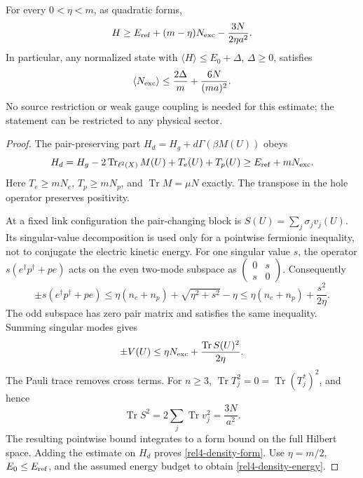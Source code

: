 \begin{proposition}
\label{rel4-density}
For every $0<\eta<m$, as quadratic forms,
\begin{equation}
 H\ge E_{\rm ref}+(m-\eta)N_{\rm exc}
                  -\frac{3N}{2\eta a^2}.
 \label{rel4-density-form}
\end{equation}
In particular, any normalized state with
$\langle H\rangle\le E_0+\Delta$, $\Delta\ge0$, satisfies
\begin{equation}
 \langle N_{\rm exc}\rangle
 \le \frac{2\Delta}{m}+\frac{6N}{(ma)^2}.
 \label{rel4-density-energy}
\end{equation}
No source restriction or weak gauge coupling is needed for this
estimate; the statement can be restricted to any physical sector.
\end{proposition}
\begin{proof}
The pair-preserving part $H_d=H_g+d\Gamma(\beta M(U))$ obeys
\[
 H_d=H_g-2\operatorname{Tr}_{\ell^2(X)}M(U)+T_e(U)+T_p(U)
 \ge E_{\rm ref}+mN_{\rm exc}.
\]
Here $T_e\ge mN_e$, $T_p\ge mN_p$, and
$\operatorname{Tr}M=\mu N$ exactly. The transpose in the hole
operator preserves positivity.

At a fixed link configuration the pair-changing block is
$S(U)=\sum_j\sigma_jv_j(U)$. Its singular-value decomposition is
used only for a pointwise fermionic inequality, not to conjugate the
electric kinetic energy. For one singular value $s$, the operator
$s(e^\dagger p^\dagger+pe)$ acts on the even two-mode subspace as
$\left(\begin{smallmatrix}0&s\\s&0\end{smallmatrix}\right)$.
Consequently
\[
 \pm s(e^\dagger p^\dagger+pe)
 \le\eta(n_e+n_p)+\sqrt{\eta^2+s^2}-\eta
 \le\eta(n_e+n_p)+\frac{s^2}{2\eta}.
\]
The odd subspace has zero pair matrix and satisfies the same inequality.
Summing singular modes gives
\[
 \pm V(U)\le\eta N_{\rm exc}
             +\frac{\operatorname{Tr}S(U)^2}{2\eta}.
\]
The Pauli trace removes cross terms. For $n\ge3$,
$\operatorname{Tr}T_j^2=0=\operatorname{Tr}(T_j^*)^2$, and hence
\[
 \operatorname{Tr}S^2
 =2\sum_j\operatorname{Tr}v_j^2=\frac{3N}{a^2}.
\]
The resulting pointwise bound integrates to a form bound on the
full Hilbert space. Adding the estimate on $H_d$ proves
\eqref{rel4-density-form}. Use $\eta=m/2$,
$E_0\le E_{\rm ref}$, and the assumed energy budget to obtain
\eqref{rel4-density-energy}.
\end{proof}

